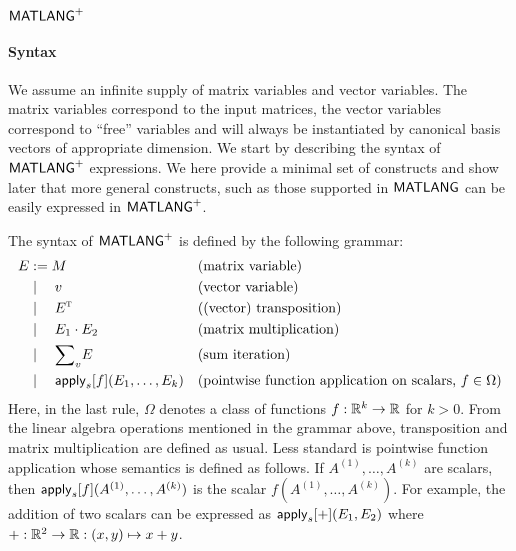 \newpage 
\section{$\mathsf{MATLANG}^{\sf +}$}

\paragraph{Syntax}
We assume an infinite supply of matrix variables and vector variables. The matrix variables  correspond to the input matrices, the vector variables
correspond to ``free'' variables and will always be instantiated by canonical basis vectors of appropriate dimension.
%
%
%
%
%
We start by describing  the syntax of  $\mathsf{MATLANG}^{\sf +}$ expressions. We here provide a minimal set of constructs and show later that more general constructs, such as those supported
in $\mathsf{MATLANG}$ can be easily expressed in $\mathsf{MATLANG}^{\sf +}$.  

The syntax of $\mathsf{MATLANG}^{\sf +}$ is defined by the following grammar:
\begin{align*}
	E&:=M && \text{(matrix variable)} \\
       &\mid\quad v &&\text{(vector variable)}\\
        &\mid\quad E^{\textsc{t}} &&\text{((vector) transposition)}\\
    &\mid\quad E_1 \cdot E_2 && \text{(matrix multiplication)} \\
	  &\mid\quad{\sum}_{v} E &&\text{(sum iteration)} \\
	      &\mid\quad \mathsf{apply}_s[f](E_1, \ldots, E_k) && \text{(pointwise function
    application on scalars, $f \in \Omega$)}
\end{align*}
Here, in the last rule, $\Omega$ denotes a class of functions $f:\mathbb{R}^k\to \mathbb{R}$ for $k>0$.  From the linear algebra operations mentioned in the grammar above, transposition and matrix multiplication are defined as usual. Less standard is  pointwise function application whose semantics is defined as follows. If $A^{(1)},\dots,A^{(k)}$ are scalars, then 
$\mathsf{apply}_s[f](A^{(1)},\dots,A^{(k)})$ is the scalar $f(A^{(1)},\dots,A^{(k)})$.  For example, the addition of two scalars can be expressed as $\mathsf{apply}_s[+](E_1,E_2)$ where $+:\mathbb{R}^2\to \mathbb{R}:(x,y)\mapsto x+y$.

